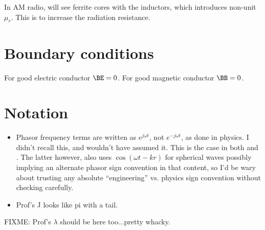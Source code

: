 In AM radio, will see ferrite cores with the inductors, which introduces non-unit \( \mu_r \).  This is to increase the radiation resistance.

\section{Boundary conditions}

For good electric conductor \( \BE = 0 \).
For good magnetic conductor \( \BB = 0 \).

\section{Notation}

\begin{itemize}
\item Phasor frequency terms are written as \( e^{j \omega t} \), not \( e^{-j \omega t} \), as done in physics.  I didn't recall this, and wouldn't have assumed it.  This is the case in both \citep{jackson1975cew:simpleRadiating} and \citep{griffiths1999introduction:waves}.  The latter however, also uses \( \cos(\omega t - k r) \) for spherical waves possibly implying an alternate phasor sign convention in that content, so I'd be wary about trusting any absolute ``engineering'' vs. physics sign convention without checking carefully.
\item Prof's J looks like pi with a tail.
\end{itemize}
FIXME: Prof's \( \lambda \) should be here too...pretty whacky.

%
%

\EndArticle
